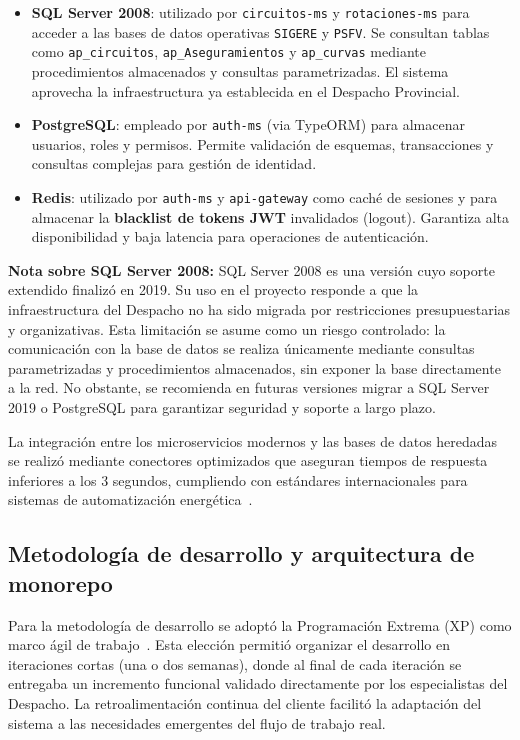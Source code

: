 \begin{itemize}
    \item \textbf{SQL Server 2008}: utilizado por \texttt{circuitos-ms} y \texttt{rotaciones-ms} para acceder a las bases de datos operativas \texttt{SIGERE} y \texttt{PSFV}. Se consultan tablas como \texttt{ap\_circuitos}, \texttt{ap\_Aseguramientos} y \texttt{ap\_curvas} mediante procedimientos almacenados y consultas parametrizadas. El sistema aprovecha la infraestructura ya establecida en el Despacho Provincial.
    
    \item \textbf{PostgreSQL}: empleado por \texttt{auth-ms} (via TypeORM) para almacenar usuarios, roles y permisos. Permite validación de esquemas, transacciones y consultas complejas para gestión de identidad.
    
    \item \textbf{Redis}: utilizado por \texttt{auth-ms} y \texttt{api-gateway} como caché de sesiones y para almacenar la \textbf{blacklist de tokens JWT} invalidados (logout). Garantiza alta disponibilidad y baja latencia para operaciones de autenticación.
\end{itemize}

\textbf{Nota sobre SQL Server 2008:} SQL Server 2008 es una versión cuyo soporte extendido finalizó en 2019. Su uso en el proyecto responde a que la infraestructura del Despacho no ha sido migrada por restricciones presupuestarias y organizativas. Esta limitación se asume como un riesgo controlado: la comunicación con la base de datos se realiza únicamente mediante consultas parametrizadas y procedimientos almacenados, sin exponer la base directamente a la red. No obstante, se recomienda en futuras versiones migrar a SQL Server 2019 o PostgreSQL para garantizar seguridad y soporte a largo plazo.

La integración entre los microservicios modernos y las bases de datos heredadas se realizó mediante conectores optimizados que aseguran tiempos de respuesta inferiores a los 3 segundos, cumpliendo con estándares internacionales para sistemas de automatización energética~\citep{ansi2018}.

\subsection{Metodología de desarrollo y arquitectura de monorepo}
Para la metodología de desarrollo se adoptó la Programación Extrema (XP) como marco ágil de trabajo~\citep{beck2000}. Esta elección permitió organizar el desarrollo en iteraciones cortas (una o dos semanas), donde al final de cada iteración se entregaba un incremento funcional validado directamente por los especialistas del Despacho. La retroalimentación continua del cliente facilitó la adaptación del sistema a las necesidades emergentes del flujo de trabajo real.

